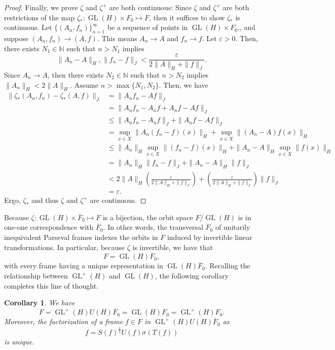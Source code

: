 \documentclass{article}
\newtheorem{cor}[defn]{Corollary}
\newcommand{\GL}{\operatorname{GL}}
\newcommand{\Fbar}{\overline{F}}
\newcommand{\eps}{\varepsilon}
\begin{document}
\begin{proof}
Finally, we prove $\zeta$ and $\zeta^+$ are both continuous: Since $\zeta$ and $\zeta^+$ are both restrictions of the map $\zeta_*:\GL(H)\times F_0\mapsto F$, then it suffices to show $\zeta_*$ is continuous. Let $\{(A_n,f_n)\}_{n=1}^\infty$ be a sequence of points in $\GL(H)\times F_0$., and suppose $(A_n,f_n)\rightarrow (A,f)$. This means $A_n\rightarrow A$ and $f_n\rightarrow f$. Let $\eps>0$. Then, there exists $N_1\in\mathbb{N}$ such that $n>N_1$ implies
\[ \|A_n-A\|_H,\|f_n-f\|_J <\frac{\eps}{2\|A\|_H+\|f\|_J}. \]
Since $A_n\rightarrow A$, then there exists $N_2\in\mathbb{N}$ such that $n>N_2$ implies $\|A_n\|_H<2\|A\|_H$. Assume $n>\max\{N_1,N_2\}$. Then, we have
\begin{align*}
\|\zeta_*(A_n,f_n)-\zeta_*(A,f)\|_J &= \|A_nf_n-Af\|_J \\
&= \|A_nf_n-A_nf+A_nf-Af\|_J \\
&\leq \|A_nf_n-A_nf\|_J+\|A_nf-Af\|_J \\
&= \sup_{x\in X} \|A_n(f_n-f)(x)\|_H+\sup_{x\in X} \|(A_n-A)f(x)\|_H \\
&\leq \|A_n\|_H \sup_{x\in X}\|(f_n-f)(x)\|_H + \|A_n-A\|_H\sup_{x\in X}\|f(x)\|_H \\
&= \|A_n\|_H\|f_n-f\|_J+\|A_n-A\|_H\|f\|_J \\
&< 2\|A\|_H\left(\frac{\eps}{2\|A\|_H+\|f\|_J}\right)+\left(\frac{\eps}{2\|A\|_H+\|f\|_J}\right)\|f\|_J \\
&= \eps.
\end{align*}
Ergo, $\zeta_*$ and thus $\zeta$ and $\zeta^+$ are continuous.
\end{proof}

Because $\zeta:\GL(H)\times\Fbar_0\mapsto F$ is a bijection, the orbit space $F/\GL(H)$ is in one-one correspondence with $\Fbar_0$. In other words, the transversal $\Fbar_0$ of unitarily inequivalent Parseval frames indexes the orbits in $F$ induced by invertible linear transformations. In particular, because $\zeta$ is invertible, we have that 
$$F = \GL(H)\Fbar_0,$$ 
with every frame having a unique representation in $\GL(H)\Fbar_0$. Recalling the relationship between $\GL^+(H)$ and $\GL(H)$, the following corollary completes this line of thought.
\begin{cor} \label{Factorization}
We have
\[ F = \GL^+(H) U(H) \Fbar_0
= \GL(H) \Fbar_0
= \GL^+(H) F_0. \]
Moreover, the factorization of a frame $f\in F$ in $\GL^+(H)U(H)\Fbar_0$ as
\[ f = S(f)^{\frac{1}{2}}U(f)\sigma(T(f)) \]
is unique.
\end{cor}
\end{document}
